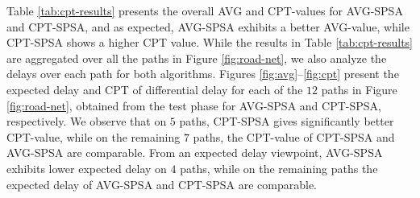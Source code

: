 Table \ref{tab:cpt-results} presents the overall AVG and CPT-values for AVG-SPSA and CPT-SPSA, and as expected, AVG-SPSA exhibits a better AVG-value, while CPT-SPSA shows a higher CPT value. While the results in Table \ref{tab:cpt-results} are aggregated over all the paths in Figure \ref{fig:road-net}, we also analyze the delays over each path for both algorithms. 
Figures \ref{fig:avg}--\ref{fig:cpt} present the expected delay and CPT of differential delay for each of the $12$ paths in Figure \ref{fig:road-net}, obtained from the test phase for AVG-SPSA and CPT-SPSA, respectively.  
We observe that on $5$ paths, CPT-SPSA gives significantly better CPT-value, while on the remaining $7$ paths, the CPT-value of CPT-SPSA and AVG-SPSA are comparable. From an expected delay viewpoint, AVG-SPSA exhibits lower expected delay on $4$ paths, while on the remaining paths the expected delay of AVG-SPSA and CPT-SPSA	are comparable. 



